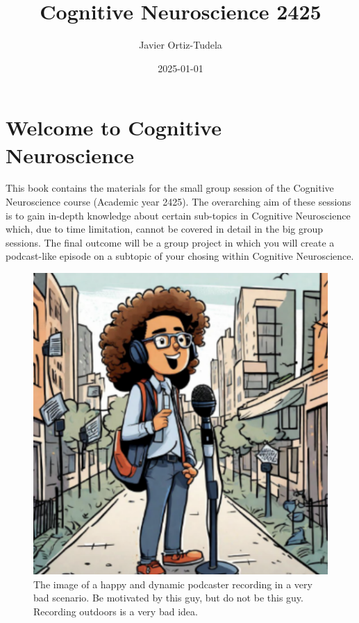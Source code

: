 \documentclass[
  letterpaper,
  DIV=11,
  numbers=noendperiod]{scrreprt}
\title{Cognitive Neuroscience 2425}
\author{Javier Ortiz-Tudela}
\date{2025-01-01}
\renewcommand*\contentsname{Table of contents}
\newcommand\contentsname{Table of contents}
\begin{document}
\maketitle

\renewcommand*\contentsname{Table of contents}
{
\hypersetup{linkcolor=}
\setcounter{tocdepth}{2}
\tableofcontents
}


\chapter{Welcome to Cognitive
Neuroscience}\label{welcome-to-cognitive-neuroscience}

This book contains the materials for the small group session of the
Cognitive Neuroscience course (Academic year 2425). The overarching aim
of these sessions is to gain in-depth knowledge about certain sub-topics
in Cognitive Neuroscience which, due to time limitation, cannot be
covered in detail in the big group sessions. The final outcome will be a
group project in which you will create a podcast-like episode on a
subtopic of your chosing within Cognitive Neuroscience.

\begin{figure}[H]

{\centering \includegraphics{_images/podcaster.png}

}

\caption{The image of a happy and dynamic podcaster recording in a very
bad scenario. Be motivated by this guy, but do not be this guy.
Recording outdoors is a very bad idea.}

\end{figure}%
\end{document}
